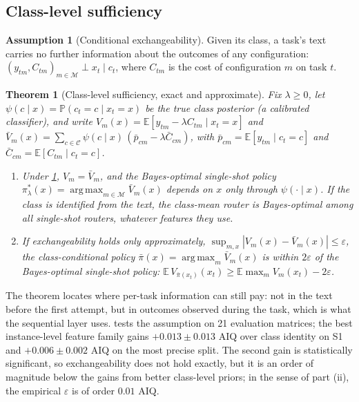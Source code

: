 \documentclass[11pt,a4paper]{article}
\newtheorem{theorem}{Theorem}
\theoremstyle{definition}
\newtheorem{assumption}{Assumption}
\theoremstyle{remark}
\theoremstyle{definition}
\newcommand{\E}{\mathbb{E}}
\renewcommand{\Pr}{\mathbb{P}}
\newcommand{\mods}{\mathcal{M}}
\newcommand{\cls}{\mathcal{C}}
\DeclareMathOperator*{\argmax}{arg\,max}
\begin{document}
\subsection{Class-level sufficiency}

\begin{assumption}[Conditional exchangeability]
\label{ass:exch}
Given its class, a task's text carries no further information about the outcomes of any configuration: $(y_{tm},C_{tm})_{m\in\mods}\perp x_t\mid c_t$, where $C_{tm}$ is the cost of configuration $m$ on task $t$.
\end{assumption}

\begin{theorem}[Class-level sufficiency, exact and approximate]
\label{thm:class}
Fix $\lambda\ge0$, let $\psi(c\mid x)=\Pr(c_t=c\mid x_t=x)$ be the true class posterior (a calibrated classifier), and write $V_m(x)=\E[y_{tm}-\lambda C_{tm}\mid x_t=x]$ and $\bar V_m(x)=\sum_{c\in\cls}\psi(c\mid x)\,(\bar p_{cm}-\lambda\bar C_{cm})$, with $\bar p_{cm}=\E[y_{tm}\mid c_t=c]$ and $\bar C_{cm}=\E[C_{tm}\mid c_t=c]$.
\begin{enumerate}[label=(\roman*),leftmargin=*]
\item Under \cref{ass:exch}, $V_m=\bar V_m$, and the Bayes-optimal single-shot policy $\pi^\ast_\lambda(x)=\argmax_{m\in\mods}\bar V_m(x)$ depends on $x$ only through $\psi(\cdot\mid x)$. If the class is identified from the text, the class-mean router is Bayes-optimal among all single-shot routers, whatever features they use.
\item If exchangeability holds only approximately, $\sup_{m,x}|V_m(x)-\bar V_m(x)|\le\varepsilon$, the class-conditional policy $\bar\pi(x)=\argmax_m\bar V_m(x)$ is within $2\varepsilon$ of the Bayes-optimal single-shot policy: $\E\,V_{\bar\pi(x_t)}(x_t)\ge\E\max_mV_m(x_t)-2\varepsilon$.
\end{enumerate}
\end{theorem}

The theorem locates where per-task information can still pay: not in the text before the first attempt, but in outcomes observed during the task, which is what the sequential layer uses.  tests the assumption on 21 evaluation matrices; the best instance-level feature family gains $+0.013\pm0.013$ AIQ over class identity on S1 and $+0.006\pm0.002$ AIQ on the most precise split. The second gain is statistically significant, so exchangeability does not hold exactly, but it is an order of magnitude below the gains from better class-level priors; in the sense of part (ii), the empirical $\varepsilon$ is of order $0.01$ AIQ.
\end{document}
